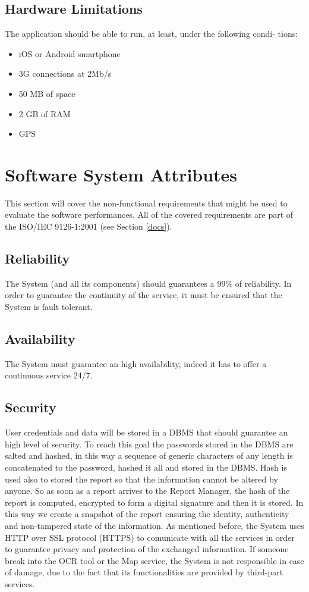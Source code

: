 \documentclass{report}
\begin{document}
\subsection{Hardware Limitations}
The application should be able to run, at least, under the following condi-
tions:
\begin{itemize}
	\item iOS or Android smartphone
	\item 3G connections at 2Mb/s
	\item 50 MB of space
	\item 2 GB of RAM
	\item GPS
\end{itemize}
\section{Software System Attributes}
This section will cover the non-functional requirements that might be used to evaluate the software performances. All of the covered requirements are part of the ISO/IEC 9126-1:2001 (see Section \ref{docs}).
\subsection{Reliability}
The System (and all its components) should guarantees a 99\% of reliability. In order to guarantee the continuity of the service, it must be ensured that the System is fault tolerant.
\subsection{Availability}
The System must guarantee an high availability, indeed it has to offer a continuous service 24/7. 
\subsection{Security} \label{sec:security}
User credentials and data will be stored in a DBMS that should guarantee an high level of security. To reach this goal the passwords stored in the DBMS are salted and hashed, in this way a sequence of generic characters of any length is concatenated to the password, hashed it all and stored in the DBMS.
Hash is used also to stored the report so that the information cannot be altered by anyone. So as soon as a report arrives to the Report Manager, the hash of the report is computed, encrypted to form a digital signature and then it is stored. In this way we create a snapshot of the report ensuring the identity, authenticity and non-tampered state of the information.
As mentioned before, the System uses HTTP over SSL protocol (HTTPS) to comunicate with all the services in order to guarantee privacy and protection of the exchanged information.
\newline
If someone break into the OCR tool or the Map service, the System is not responsible in case of damage, due to the fact that its functionalities are provided by third-part services.  
\end{document}
